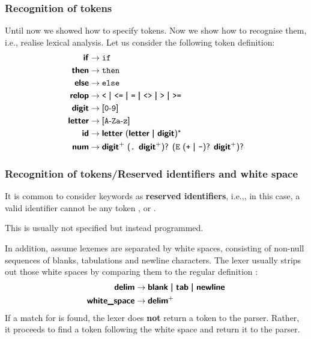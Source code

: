 
%
\begin{frame}
\frametitle{Recognition of tokens}

Until now we showed how to specify tokens. Now we show how to
recognise them, i.e., realise lexical analysis. Let us consider the
following token definition:
\begin{align*}
\term{if} & \rightarrow \text{\exc{if}}\\
\term{then} & \rightarrow \text{\exc{then}}\\
\term{else} & \rightarrow \text{\exc{else}}\\
\term{relop} & \rightarrow \text{\exc{<} \disj \exc{<=} \disj \exc{=}
  \disj \exc{<>} \disj \exc{>} \disj \exc{>=}}\\
\term{digit} & \rightarrow \text{\lb\exc{0}\dash\exc{9}\rb{}}\\
\term{letter} & \rightarrow
\text{\lb\exc{A}\dash\exc{Z}\exc{a}\dash\exc{z}\rb}\\
\term{id} & \rightarrow \text{\term{letter} \lparen\term{letter} \disj
  \term{digit}\rparen\kleene}\\
\term{num} & \rightarrow \text{\term{digit}\plus{} \lparen\exc{.}
\term{digit}\plus\rparen\opt{} \lparen\exc{E} \lparen\exc{+} \disj
\exc{-}\rparen\opt{} \term{digit}\plus\rparen\opt}
\end{align*}

\end{frame}

%
\begin{frame}
\frametitle{Recognition of tokens/Reserved identifiers and white space}

It is common to consider keywords as \textbf{reserved identifiers},
i.e.,, in this case, a valid identifier cannot be any
token ,  or .

\bigskip

This is usually not specified but instead programmed.

\bigskip

In addition, assume lexemes are separated by white spaces, consisting
of non-null sequences of blanks, tabulations and newline
characters. The lexer usually strips out those white spaces by
comparing them to the regular definition :
\begin{align*}
\term{delim} & \rightarrow \text{\term{blank} \disj \term{tab} \disj
    \term{newline}}\\
\term{white\_space} & \rightarrow \text{\term{delim}\plus}
\end{align*}
If a match for  is found, the lexer
does \textbf{not} return a token to the parser. Rather, it proceeds to
find a token following the white space and return it to the parser.

\end{frame}

